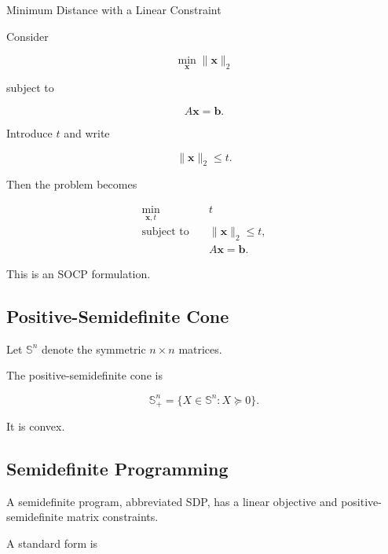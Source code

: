 \begin{workedexamplebox}{Minimum Distance with a Linear Constraint}

Consider

\[
\min_{\mathbf{x}}
\|\mathbf{x}\|_2
\]

subject to

\[
A\mathbf{x}=\mathbf{b}.
\]

Introduce \(t\) and write

\[
\|\mathbf{x}\|_2\leq t.
\]

Then the problem becomes

\begin{answerbox}
\[
\boxed{
\begin{aligned}
\min_{\mathbf{x},t}
\quad&
t
\\
\text{subject to}
\quad&
\|\mathbf{x}\|_2\leq t,
\\
&
A\mathbf{x}=\mathbf{b}.
\end{aligned}
}
\]
\end{answerbox}

This is an SOCP formulation.

\end{workedexamplebox}

\subsection{Positive-Semidefinite Cone}
\label{subsec:positive-semidefinite-cone}

Let \(\mathbb{S}^n\) denote the symmetric \(n\times n\) matrices.

The positive-semidefinite cone is

\[
\boxed{
\mathbb{S}_+^n
=
\{
X\in\mathbb{S}^n:
X\succeq0
\}.
}
\]

It is convex.

\subsection{Semidefinite Programming}
\label{subsec:semidefinite-programming}

A semidefinite program, abbreviated SDP, has a linear objective and
positive-semidefinite matrix constraints.

A standard form is

